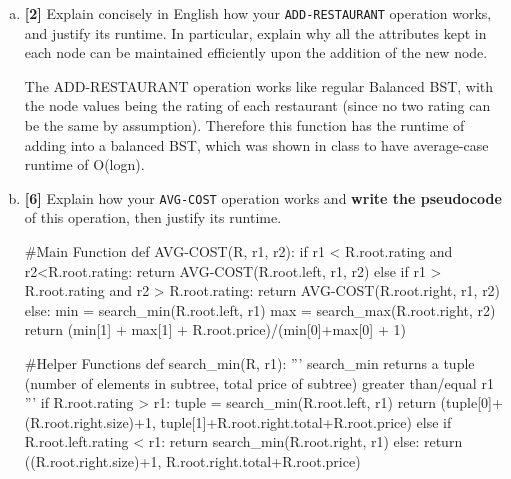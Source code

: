 \documentclass{assignment-263}
\begin{document}
\begin{enumerate}
\begin{enumerate}[(a)]
  \item \textbf{[2]} Explain concisely in English how your \texttt{ADD-RESTAURANT}
    operation works, and justify its runtime. In particular, explain
    why all the attributes kept in each node can be maintained
    efficiently upon the addition of the new node. \vskip10pt
    
    The ADD-RESTAURANT operation works like regular Balanced BST, with the node values being the rating of each restaurant (since no two rating can be the same by assumption). Therefore this function has the runtime of adding into a balanced BST, which was shown in class to have average-case runtime of O(logn). \vskip10pt
    \clearpage
  \item \textbf{[6]} Explain how your \texttt{AVG-COST} operation works and
    \textbf{write the pseudocode} of this operation, then justify its
    runtime. \vskip10pt
    
\begin{python}
#Main Function
def AVG-COST(R, r1, r2):
    if r1 < R.root.rating and r2<R.root.rating:
        return AVG-COST(R.root.left, r1, r2)
    else if r1 > R.root.rating and r2 > R.root.rating:
        return AVG-COST(R.root.right, r1, r2)
    else:
        min = search_min(R.root.left, r1)
        max = search_max(R.root.right, r2)
        return (min[1] + max[1] + R.root.price)/(min[0]+max[0] + 1)
        
#Helper Functions
def search_min(R, r1):
    '''
  search_min returns a tuple (number of elements in subtree, 
  total price of subtree) greater than/equal r1
  '''
  if R.root.rating > r1:
    tuple = search_min(R.root.left, r1)
    return (tuple[0]+(R.root.right.size)+1, tuple[1]+R.root.right.total+R.root.price)
  else if R.root.left.rating < r1:
    return search_min(R.root.right, r1)
  else:
    return ((R.root.right.size)+1, R.root.right.total+R.root.price)
    

\end{python}
\end{enumerate}
\end{enumerate}
\end{document}
